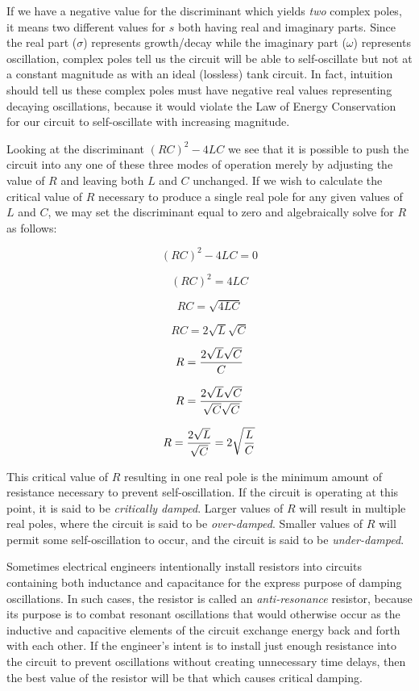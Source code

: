 If we have a negative value for the discriminant which yields \textit{two} complex poles, it means two different values for $s$ both having real and imaginary parts.  Since the real part ($\sigma$) represents growth/decay while the imaginary part ($\omega$) represents oscillation, complex poles tell us the circuit will be able to self-oscillate but not at a constant magnitude as with an ideal (lossless) tank circuit.  In fact, intuition should tell us these complex poles must have negative real values representing decaying oscillations, because it would violate the Law of Energy Conservation for our circuit to self-oscillate with increasing magnitude.

\vskip 10pt

Looking at the discriminant $(RC)^2 - 4LC$ we see that it is possible to push the circuit into any one of these three modes of operation merely by adjusting the value of $R$ and leaving both $L$ and $C$ unchanged.  If we wish to calculate the critical value of $R$ necessary to produce a single real pole for any given values of $L$ and $C$, we may set the discriminant equal to zero and algebraically solve for $R$ as follows:

$$(RC)^2 - 4LC = 0$$

$$(RC)^2 = 4LC$$

$$RC = \sqrt{4LC}$$

$$RC = 2 \sqrt{L} \sqrt{C}$$

$$R = {2 \sqrt{L} \sqrt{C} \over C}$$

$$R = {{2 \sqrt{L} \sqrt{C}} \over {\sqrt{C} \sqrt{C}}}$$

$$R = {2 \sqrt{L} \over \sqrt{C}} = 2 \sqrt{L \over C}$$

This critical value of $R$ resulting in one real pole is the minimum amount of resistance necessary to prevent self-oscillation.  If the circuit is operating at this point, it is said to be \textit{critically damped}.  Larger values of $R$ will result in multiple real poles, where the circuit is said to be \textit{over-damped}.  Smaller values of $R$ will permit some self-oscillation to occur, and the circuit is said to be \textit{under-damped}.        

\vskip 10pt

Sometimes electrical engineers intentionally install resistors into circuits containing both inductance and capacitance for the express purpose of damping oscillations.  In such cases, the resistor is called an \textit{anti-resonance} resistor, because its purpose is to combat resonant oscillations that would otherwise occur as the inductive and capacitive elements of the circuit exchange energy back and forth with each other.  If the engineer's intent is to install just enough resistance into the circuit to prevent oscillations without creating unnecessary time delays, then the best value of the resistor will be that which causes critical damping.    

